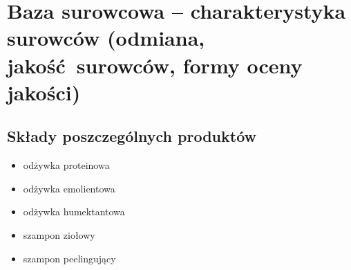 \section{Baza surowcowa -- charakterystyka surowców (odmiana, jakość surowców, formy oceny jakości)}

\subsection{Składy poszczególnych produktów}

\begin{itemize}
\item odżywka proteinowa
\item odżywka emolientowa
\item odżywka humektantowa
\item szampon ziołowy
\item szampon peelingujący
\end{itemize}\vspace{\baselineskip}

